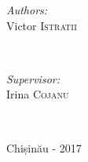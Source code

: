 \begin{titlepage}
\begin{center}
      \vspace{20mm}

      \begin{minipage}{0.4\textwidth}
      \begin{flushleft} \large
      \emph{Authors:}\\
      Victor \textsc{Istratii}
      \end{flushleft}
      \end{minipage}
      ~
      \begin{minipage}{0.4\textwidth}
      \begin{flushright} \large
      \emph{Supervisor:} \\
      Irina \textsc{Cojanu} %
      \end{flushright}
      \end{minipage}\\[4cm]

      \vspace{5 mm}
      
      \large Chișinău - 2017






      \vfill %
      \end{center}
      
\end{titlepage}
